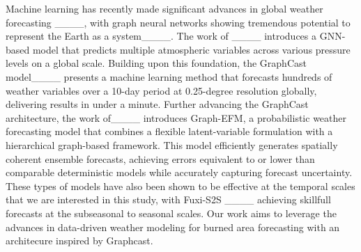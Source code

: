 Machine learning has recently made significant advances in global weather forecasting ____, with graph neural networks showing tremendous potential to represent the Earth as a system____. The work of ____ introduces a GNN-based model that predicts multiple atmospheric variables across various pressure levels on a global scale. 
Building upon this foundation, the GraphCast model____ presents a machine learning method that forecasts hundreds of weather variables over a 10-day period at 0.25-degree resolution globally, delivering results in under a minute.
Further advancing the GraphCast architecture, the work of____ introduces Graph-EFM, a probabilistic weather forecasting model that combines a flexible latent-variable formulation with a hierarchical graph-based framework. This model efficiently generates spatially coherent ensemble forecasts, achieving errors equivalent to or lower than comparable deterministic models while accurately capturing forecast uncertainty. These types of models  have also been shown to be effective at the temporal scales that we are interested in this study, with Fuxi-S2S ____ achieving skillfull forecasts at the subseasonal to seasonal scales. Our work aims to leverage the advances in data-driven weather modeling for burned area forecasting with an architecure inspired by Graphcast.
